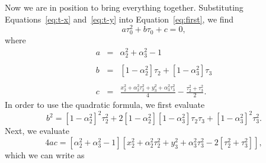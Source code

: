 \documentclass[twocolumn]{article}
\begin{document}
Now we are in position to bring everything together. Substituting
Equations~\ref{eq:t-x} and~\ref{eq:t-y} into Equation~\ref{eq:first}, we find
\begin{equation}
   a\tau_0^2 + b\tau_0 + c = 0,
\end{equation}
where
\begin{eqnarray}
   a &=& \alpha_2^2 + \alpha_3^2 - 1\\
   \nonumber\\
   b &=& \left[1 - \alpha_2^2\right]\tau_2 + \left[1 -
         \alpha_3^2\right]\tau_3\\
   \nonumber\\
   c &=& \frac{x_2^2 + \alpha_2^2\tau_2^2 + y_3^2 + \alpha_3^2\tau_3^2}{4} -
         \frac{\tau_2^2 + \tau_3^2}{2}.
\end{eqnarray}
In order to use the quadratic formula, we first evaluate
\begin{equation}
   b^2 = \left[1 - \alpha_2^2\right]^2 \tau_2^2 + 2 \left[1 -
   \alpha_2^2\right]\left[1 - \alpha_3^2\right] \tau_2 \tau_3 + \left[1 -
   \alpha_3^2\right]^2 \tau_3^2.
\end{equation}
Next, we evaluate
\begin{equation}
   4ac = \left[\alpha_2^2 + \alpha_3^2 - 1\right] \left[x_2^2 + \alpha_2^2
   \tau_2^2 + y_3^2 + \alpha_3^2 \tau_3^2 - 2\left[\tau_2^2 +
   \tau_3^2\right]\right],
\end{equation}
which we can write as
\end{document}
